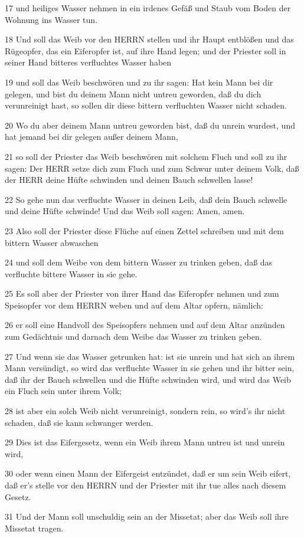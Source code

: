 \par 17 und heiliges Wasser nehmen in ein irdenes Gefäß und Staub vom Boden der Wohnung ins Wasser tun.
\par 18 Und soll das Weib vor den HERRN stellen und ihr Haupt entblößen und das Rügeopfer, das ein Eiferopfer ist, auf ihre Hand legen; und der Priester soll in seiner Hand bitteres verfluchtes Wasser haben
\par 19 und soll das Weib beschwören und zu ihr sagen: Hat kein Mann bei dir gelegen, und bist du deinem Mann nicht untreu geworden, daß du dich verunreinigt hast, so sollen dir diese bittern verfluchten Wasser nicht schaden.
\par 20 Wo du aber deinem Mann untreu geworden bist, daß du unrein wurdest, und hat jemand bei dir gelegen außer deinem Mann,
\par 21 so soll der Priester das Weib beschwören mit solchem Fluch und soll zu ihr sagen: Der HERR setze dich zum Fluch und zum Schwur unter deinem Volk, daß der HERR deine Hüfte schwinden und deinen Bauch schwellen lasse!
\par 22 So gehe nun das verfluchte Wasser in deinen Leib, daß dein Bauch schwelle und deine Hüfte schwinde! Und das Weib soll sagen: Amen, amen.
\par 23 Also soll der Priester diese Flüche auf einen Zettel schreiben und mit dem bittern Wasser abwaschen
\par 24 und soll dem Weibe von dem bittern Wasser zu trinken geben, daß das verfluchte bittere Wasser in sie gehe.
\par 25 Es soll aber der Priester von ihrer Hand das Eiferopfer nehmen und zum Speisopfer vor dem HERRN weben und auf dem Altar opfern, nämlich:
\par 26 er soll eine Handvoll des Speisopfers nehmen und auf dem Altar anzünden zum Gedächtnis und darnach dem Weibe das Wasser zu trinken geben.
\par 27 Und wenn sie das Wasser getrunken hat: ist sie unrein und hat sich an ihrem Mann versündigt, so wird das verfluchte Wasser in sie gehen und ihr bitter sein, daß ihr der Bauch schwellen und die Hüfte schwinden wird, und wird das Weib ein Fluch sein unter ihrem Volk;
\par 28 ist aber ein solch Weib nicht verunreinigt, sondern rein, so wird's ihr nicht schaden, daß sie kann schwanger werden.
\par 29 Dies ist das Eifergesetz, wenn ein Weib ihrem Mann untreu ist und unrein wird,
\par 30 oder wenn einen Mann der Eifergeist entzündet, daß er um sein Weib eifert, daß er's stelle vor den HERRN und der Priester mit ihr tue alles nach diesem Gesetz.
\par 31 Und der Mann soll unschuldig sein an der Missetat; aber das Weib soll ihre Missetat tragen.

